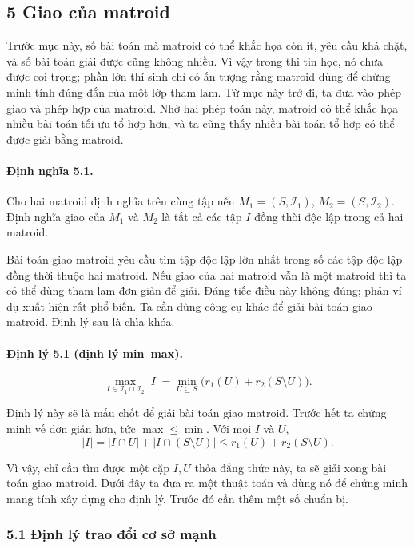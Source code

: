 \documentclass[11pt]{article}
\begin{document}
\subsection*{5 Giao của matroid}

Trước mục này, số bài toán mà matroid có thể khắc họa còn ít, yêu cầu khá chặt,
và số bài toán giải được cũng không nhiều. Vì vậy trong thi tin học, nó chưa
được coi trọng; phần lớn thí sinh chỉ có ấn tượng rằng matroid dùng để chứng
minh tính đúng đắn của một lớp tham lam. Từ mục này trở đi, ta đưa vào phép
giao và phép hợp của matroid. Nhờ hai phép toán này, matroid có thể khắc họa
nhiều bài toán tối ưu tổ hợp hơn, và ta cũng thấy nhiều bài toán tổ hợp có thể
được giải bằng matroid.

\paragraph{Định nghĩa 5.1.}
Cho hai matroid định nghĩa trên cùng tập nền
\(M_1=(S,\mathcal I_1)\), \(M_2=(S,\mathcal I_2)\). Định nghĩa giao của \(M_1\)
và \(M_2\) là tất cả các tập \(I\) đồng thời độc lập trong cả hai matroid.

Bài toán giao matroid yêu cầu tìm tập độc lập lớn nhất trong số các tập độc lập
đồng thời thuộc hai matroid. Nếu giao của hai matroid vẫn là một matroid thì ta
có thể dùng tham lam đơn giản để giải. Đáng tiếc điều này không đúng; phản ví dụ
xuất hiện rất phổ biến. Ta cần dùng công cụ khác để giải bài toán giao matroid.
Định lý sau là chìa khóa.

\paragraph{Định lý 5.1 (định lý min--max).}
\[
  \max_{I\in\mathcal I_1\cap\mathcal I_2}|I|
  =
  \min_{U\subseteq S}\bigl(r_1(U)+r_2(S\setminus U)\bigr).
\]

Định lý này sẽ là mấu chốt để giải bài toán giao matroid. Trước hết ta chứng
minh vế đơn giản hơn, tức \(\max\le\min\). Với mọi \(I\) và \(U\),
\[
  |I|=|I\cap U|+|I\cap(S\setminus U)|
  \le r_1(U)+r_2(S\setminus U).
\]

Vì vậy, chỉ cần tìm được một cặp \(I,U\) thỏa đẳng thức này, ta sẽ giải xong bài
toán giao matroid. Dưới đây ta đưa ra một thuật toán và dùng nó để chứng minh
mang tính xây dựng cho định lý. Trước đó cần thêm một số chuẩn bị.

\subsubsection*{5.1 Định lý trao đổi cơ sở mạnh}
\end{document}
